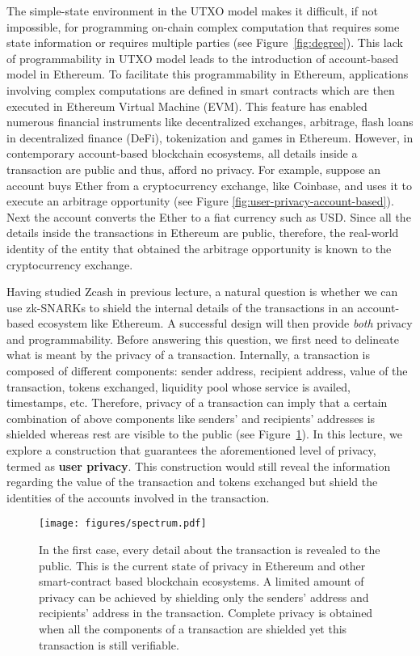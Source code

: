 \documentclass{article}
\begin{document}
The simple-state environment in the UTXO model makes it difficult, if not impossible, for programming on-chain complex computation that requires some state information or requires multiple parties (see Figure~\ref{fig:degree}). This lack of programmability in UTXO model leads to the introduction of account-based model in Ethereum. To facilitate this programmability in Ethereum, applications involving complex computations are defined in smart contracts which are then executed in Ethereum Virtual Machine (EVM). This feature has enabled numerous financial instruments like decentralized exchanges, arbitrage, flash loans in decentralized finance (DeFi), tokenization and games  in Ethereum. However, in contemporary account-based blockchain ecosystems, all details inside a transaction are public and thus, afford  no privacy.  For example,  suppose an account buys Ether from a cryptocurrency exchange, like Coinbase, and uses it to execute an arbitrage opportunity (see Figure \ref{fig:user-privacy-account-based}). Next the account  converts the Ether to a fiat currency such as USD. Since all the details inside the transactions in Ethereum are public, therefore, the real-world identity of the entity that obtained the arbitrage opportunity is known to the cryptocurrency exchange. 


Having studied Zcash in previous lecture, a natural question is whether we can use zk-SNARKs to shield the internal details of the transactions in an account-based ecosystem like Ethereum. A successful design will then provide {\em both} privacy and programmability. Before answering this question, we first need to delineate what is meant by the privacy of a transaction. Internally, a transaction is composed of different components:  sender address, recipient address, value of the transaction, tokens exchanged, liquidity pool whose service is availed, timestamps, etc. Therefore, privacy of a transaction can imply that a certain combination of above components like senders' and recipients' addresses is shielded whereas rest are visible to the public (see  Figure~\ref{fig:spectrum}). In this lecture, we  explore a construction that guarantees the aforementioned level of privacy,  termed as {\bf user privacy}. This construction would still reveal the information regarding the value of the transaction and tokens exchanged but shield the identities of the accounts involved in the transaction.  


\begin{figure}
    \centering
    \texttt{[image: figures/spectrum.pdf]}
    \caption{In the first case, every detail about the transaction is revealed to the public. This is the current state of privacy in Ethereum and other smart-contract based blockchain ecosystems. A limited amount of privacy can be achieved by shielding only the senders' address and recipients' address in the transaction. Complete privacy is obtained when all the components of a transaction are shielded yet this transaction is still verifiable.}
    \label{fig:spectrum}
\end{figure}
\end{document}
